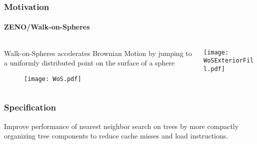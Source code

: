 \begin{frame}
  \frametitle{Motivation}
  \framesubtitle{ZENO/Walk-on-Spheres}

  \begin{columns}[T]
    \begin{column}{.5\textwidth}
      \begin{block}{}%
        {\color{white} Walk-on-Spheres accelerates Brownian Motion by jumping %
          to a uniformly distributed point on the surface of a sphere}
      \end{block}
      \vspace{-0.6cm}%
      \begin{block}{}%
        \begin{figure}
          \centering
          \texttt{[image: WoS.pdf]}
        \end{figure}
      \end{block}
    \end{column}
    \begin{column}{.5\textwidth}
      \begin{block}{}%
        \texttt{[image: WoSExteriorFill.pdf]}
      \end{block}
    \end{column}
  \end{columns}
\end{frame}

\begin{frame}
  \frametitle{Specification}

  {\color{white}
  Improve performance of nearest neighbor search on \kd trees by more compactly organizing tree components
  to reduce cache misses and load instructions.}

\end{frame}
